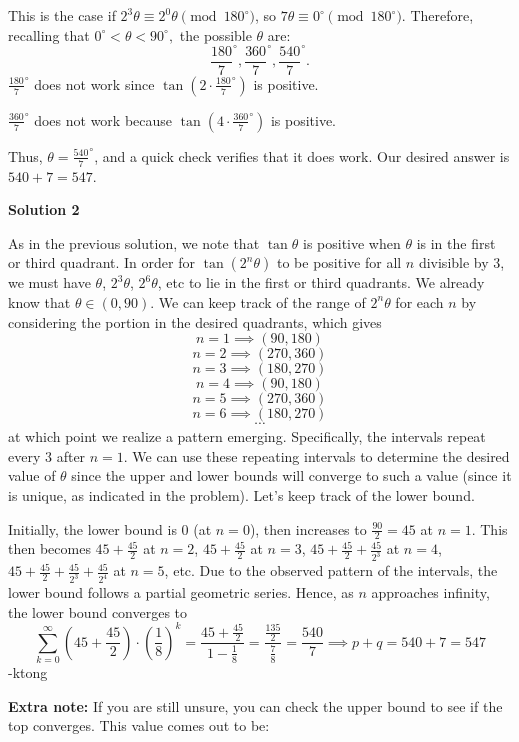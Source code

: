 \begin{enumerate}
 This is the case if $2^3\theta \equiv 2^0\theta \pmod{180^{\circ}}$, so $7\theta \equiv 0^{\circ} \pmod{180^{\circ}}$. Therefore, recalling that $0^{\circ}<\theta<90^{\circ},$ the possible $\theta$ are:
 \[\frac{180}{7}^{\circ}, \frac{360}{7}^{\circ}, \frac{540}{7}^{\circ}.\]
$\frac{180}{7}^{\circ}$ does not work since $\tan\left(2 \cdot \frac{180}{7}^{\circ}\right)$ is positive.

 $\frac{360}{7}^{\circ}$ does not work because $\tan\left(4 \cdot \frac{360}{7}^{\circ}\right)$ is positive.

 Thus, $\theta = \frac{540}{7}^{\circ}$, and a quick check verifies that it does work. Our desired answer is $540 + 7 = \boxed{547}$.

 



\textbf{Solution 2}

As in the previous solution, we note that $\tan \theta$ is positive when $\theta$ is in the first or third quadrant. In order for $\tan\left(2^n\theta\right)$ to be positive for all $n$ divisible by $3$, we must have $\theta$, $2^3\theta$, $2^6\theta$, etc to lie in the first or third quadrants. We already know that $\theta\in(0,90)$. We can keep track of the range of $2^n\theta$ for each $n$ by considering the portion in the desired quadrants, which gives 
 \[n=1 \implies (90,180)\]
 \[n=2\implies (270,360)\]
 \[n=3 \implies (180,270)\]
 \[n=4 \implies (90,180)\]
 \[n=5\implies(270,360)\]
 \[n=6 \implies (180,270)\]
 \[\cdots\]at which point we realize a pattern emerging. Specifically, the intervals repeat every $3$ after $n=1$. We can use these repeating intervals to determine the desired value of $\theta$ since the upper and lower bounds will converge to such a value (since it is unique, as indicated in the problem). Let's keep track of the lower bound.

 Initially, the lower bound is $0$ (at $n=0$), then increases to $\frac{90}{2}=45$ at $n=1$. This then becomes $45+\frac{45}{2}$ at $n=2$, $45+\frac{45}{2}$ at $n=3$, $45+\frac{45}{2}+\frac{45}{2^3}$ at $n=4$, $45+\frac{45}{2}+\frac{45}{2^3}+\frac{45}{2^4}$ at $n=5$, etc. Due to the observed pattern of the intervals, the lower bound follows a partial geometric series. Hence, as $n$ approaches infinity, the lower bound converges to 
 \[\sum_{k=0}^{\infty}\left(45+\frac{45}{2}\right)\cdot \left(\frac{1}{8}\right)^k=\frac{45+\frac{45}{2}}{1-\frac{1}{8}}=\frac{\frac{135}{2}}{\frac{7}{8}}=\frac{540}{7}\implies p+q=540+7=\boxed{547}\]-ktong

 \textbf{Extra note:} If you are still unsure, you can check the upper bound to see if the top converges. This value comes out to be: 


\end{enumerate}

